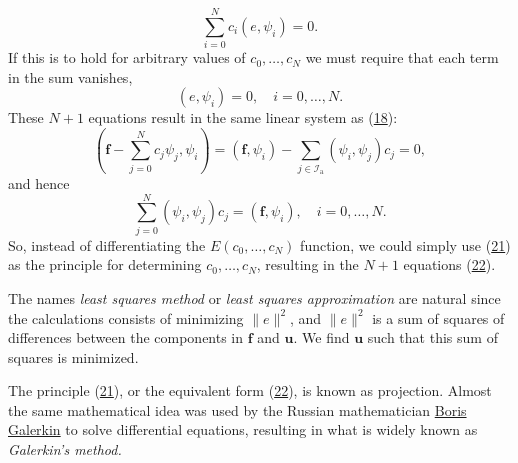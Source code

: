 \documentclass[../main.tex]{subfiles}
\begin{document}
	$$
	\sum_{i=0}^{N} c_{i}\left(e, \psi_{i}\right)=0.
	$$
	If this is to hold for arbitrary values of $c_{0}, \ldots, c_{N}$ we must require that each term in the sum vanishes,
	\begin{equation}\label{eqa22}
		\left(e, \psi_{i}\right)=0, \quad i=0, \ldots, N.
	\end{equation}
	These $N+1$ equations result in the same linear system as (\hyperref[eqa18]{18}):
	$$
	\left(\boldsymbol{f}-\sum_{j=0}^{N} c_{j} \psi_{j}, \psi_{i}\right)=\left(\boldsymbol{f}, \psi_{i}\right)-\sum_{j \in \mathcal{I}_{\mathrm{a}}}\left(\psi_{i}, \psi_{j}\right) c_{j}=0,
	$$
	and hence
	$$
	\sum_{j=0}^{N}\left(\psi_{i}, \psi_{j}\right) c_{j}=\left(\boldsymbol{f}, \psi_{i}\right), \quad i=0, \ldots, N.
	$$
	So, instead of differentiating the $E\left(c_{0}, \ldots, c_{N}\right)$ function, we could simply use (\hyperref[eqa21]{21}) as the principle for determining $c_{0}, \ldots, c_{N}$, resulting in the $N+1$ equations (\hyperref[eqa22]{22}).
	
	The names \textit{least squares method} or \textit{least squares approximation} are natural since the calculations consists of minimizing $\|e\|^{2}$, and $\|e\|^{2}$ is a sum of squares of differences between the components in $\boldsymbol{f}$ and $\boldsymbol{u}$. We find $\boldsymbol{u}$ such that this sum of squares is minimized.
	
	The principle (\hyperref[eqa21]{21}), or the equivalent form (\hyperref[eqa22]{22}), is known as projection. Almost the same mathematical idea was used by the Russian mathematician \href{https://en.wikipedia.org/wiki/Boris_Galerkin}{Boris Galerkin} to solve differential equations, resulting in what is widely known as \textit{Galerkin's method.}

\clearpage
\end{document}
